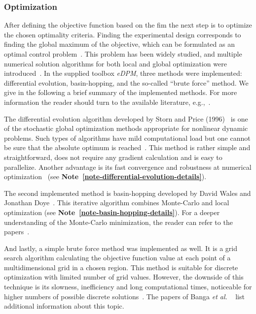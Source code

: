 \documentclass[graybox]{svmult}
\newcommand{\etal}{{\textit{et al. }}}
\begin{document}
\subsubsection{Optimization}
After defining the objective function based on the \ac{fim} the next step is to optimize the chosen optimality criteria.
Finding the experimental design corresponds to finding the global maximum of the objective, which can be formulated as an optimal control problem~\cite{espie_optimal_1989}.
This problem has been widely studied, and multiple numerical solution algorithms for both local and global optimization were introduced~\cite{esposito_global_2000, bangaImprovingFoodProcessing2003, ali_numerical_1997, runarsson_stochastic_2000}.
In the supplied toolbox {\it eDPM}, three methods were implemented: differential evolution, basin-hopping, and the so-called “brute force” method.
We give in the following a brief summary of the implemented methods.
For more information the reader should turn to the available literature, e.g.,~\cite{stornDifferentialEvolutionSimple1997, wales_global_1997}.

The differential evolution algorithm developed by Storn and Price (1996)~\cite{stornDifferentialEvolutionSimple1997} is one of the stochastic global optimization methods appropriate for nonlinear dynamic problems.
Such types of algorithms have mild computational load but one cannot be sure that the absolute optimum is reached~\cite{balsa-cantoe.bangaj.r.COMPUTINGOPTIMALDYNAMIC2008}.
This method is rather simple and straightforward, does not require any gradient calculation and is easy to parallelize.
Another advantage is its fast convergence and robustness at numerical optimization~\cite{babu_differential_2007} (see \textbf{Note~\ref{note-differential-evolution-details}}).

The second implemented method is basin-hopping developed by David Wales and Jonathan Doye~\cite{wales_global_1997}.
This iterative algorithm combines Monte-Carlo and local optimization (see \textbf{Note~\ref{note-basin-hopping-details}}).
For a deeper understanding of the Monte-Carlo minimization, the reader can refer to the papers~\cite{li_monte_1987, beichl_metropolis_2000}.

And lastly, a simple brute force method was implemented as well.
It is a grid search algorithm calculating the objective function value at each point of a multidimensional grid in a chosen region.
This method is suitable for discrete optimization with limited number of grid values.
However, the downside of this technique is its slowness, inefficiency and long computational times, noticeable for higher numbers of possible discrete solutions~\cite{scipybrute}.
The papers of Banga \etal~\cite{banga_global_1996, banga_dynamic_2005, bangaImprovingFoodProcessing2003} list additional information about this topic.
%
\end{document}
